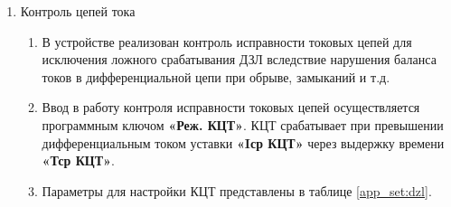 \begin{enumerate}
\begin{enumerate}
\item Характеристика срабатывания БВКЗ представлена на рисунке \ref{pict_dzl:BVKZ}.


\item Срабатывание БВКЗ происходит при превышении тормозным током 2 о.е. Коэффициент наклона зоны срабатывания БВКЗ выбирается таким образом, чтобы исключить блокировку ДЗЛ при внутренних КЗ, а именно равным коэффициенту наклона характеристики первого наклонного участка ДТЗт.

\item Коэффициент наклона характеристики возврата БВКЗ выбирается таким образом, чтобы исключить возврат блокировки при погрешности ТТ до 70\% в зоне близкой к уровню дифференциального тока при внутреннем КЗ и составляет 1,4 о.е. Коэффициент возврата характеристики БВКЗ для вертикального участка составляет 0,9, при этом предусмотрен автоматический возврат через 300 мс при отсутствии условий пуска.
\end{enumerate}

\item Контроль цепей тока
\begin{enumerate}
\item В устройстве реализован контроль исправности токовых цепей для исключения ложного срабатывания ДЗЛ вследствие нарушения баланса токов в дифференциальной цепи при обрыве, замыканий и т.д.
\item Ввод в работу контроля исправности токовых цепей осуществляется программным ключом \textbf{«Реж. КЦТ»}. КЦТ срабатывает при превышении дифференциальным током уставки \textbf{«Iср КЦТ»} через выдержку времени \textbf{«Тср КЦТ»}.
\item Параметры для настройки КЦТ представлены в таблице \ref{app_set:dzl}.
\end{enumerate}


\end{enumerate}
